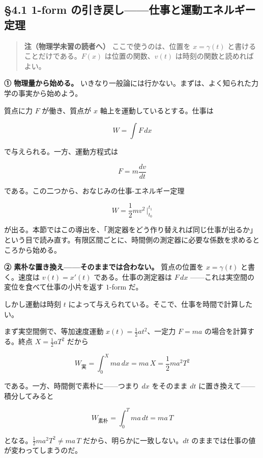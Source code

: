 \documentclass[a4paper,12pt,openany]{book}
\begin{document}
\hypertarget{form-ux306eux5f15ux304dux623bux3057ux4ed5ux4e8bux3068ux904bux52d5ux30a8ux30cdux30ebux30aeux30fcux5b9aux7406}{%
\subsection{§4.1 1-form
の引き戻し——仕事と運動エネルギー定理}\label{form-ux306eux5f15ux304dux623bux3057ux4ed5ux4e8bux3068ux904bux52d5ux30a8ux30cdux30ebux30aeux30fcux5b9aux7406}}

\begin{quote}
\textbf{注（物理学未習の読者へ）} ここで使うのは、位置を \(x=\gamma(t)\)
と書けることだけである。\(F(x)\) は位置の関数、\(v(t)\)
は時刻の関数と読めればよい。
\end{quote}

\textbf{① 物理量から始める。}
いきなり一般論には行かない。まずは、よく知られた力学の事実から始めよう。

質点に力 \(F\) が働き、質点が \(x\) 軸上を運動しているとする。仕事は

\[W = \int F\,dx\]

で与えられる。一方、運動方程式は

\[F = m\frac{dv}{dt}\]

である。この二つから、おなじみの仕事-エネルギー定理

\[W = \frac{1}{2}mv^2\,\Big|_{t_0}^{t_1}\]

が出る。本節ではこの導出を、「測定器をどう作り替えれば同じ仕事が出るか」という目で読み直す。有限区間ごとに、時間側の測定器に必要な係数を求めるところから始める。

\textbf{② 素朴な置き換え——そのままでは合わない。} 質点の位置を
\(x = \gamma(t)\) と書く。速度は \(v(t)=x'(t)\) である。仕事の測定器は
\(F\,dx\) ——これは実空間の変位を食べて仕事の小片を返す \(1\)-form
だ。

しかし運動は時刻 \(t\)
によって与えられている。そこで、仕事を時間で計算したい。

まず実空間側で、等加速度運動 \(x(t) = \frac{1}{2}at^2\)、一定力
\(F = ma\) の場合を計算する。終点 \(X = \frac{1}{2}aT^2\) だから

\[W_{\text{実}} = \int_0^X ma\,dx = ma\,X = \frac{1}{2}ma^2T^2\]

である。一方、時間側で素朴に——つまり \(dx\) をそのまま \(dt\)
に置き換えて——積分してみると

\[W_{\text{素朴}} = \int_0^T ma\,dt = ma\,T\]

となる。\(\frac{1}{2}ma^2T^2 \neq ma\,T\)
だから、明らかに一致しない。\(dt\)
のままでは仕事の値が変わってしまうのだ。
\end{document}
